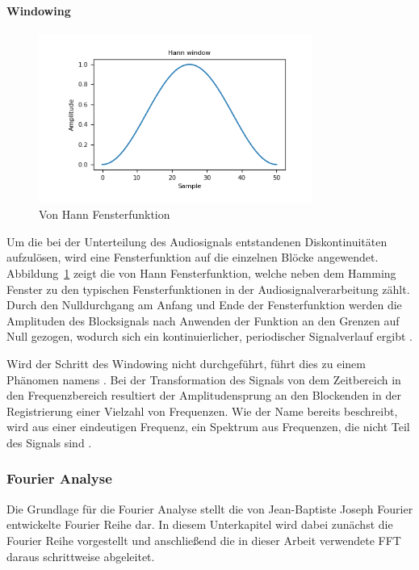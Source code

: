 \paragraph{Windowing}
\begin{figure}
  \centering
  \includegraphics[width=0.8\textwidth, keepaspectratio]{images/hann_window.png}
  \caption{Von Hann Fensterfunktion \autocite[][]{noauthor_numpyhanning_2022}}
  \label{fig:vonHannFenster}
\end{figure}
Um die bei der Unterteilung des Audiosignals entstandenen Diskontinuitäten aufzulösen, wird eine Fensterfunktion auf die einzelnen Blöcke angewendet.
Abbildung~\ref{fig:vonHannFenster} zeigt die von Hann Fensterfunktion, welche neben dem Hamming Fenster zu den typischen Fensterfunktionen in der Audiosignalverarbeitung zählt.
Durch den Nulldurchgang am Anfang und Ende der Fensterfunktion werden die Amplituden des Blocksignals nach Anwenden der Funktion an den Grenzen auf Null gezogen, wodurch sich ein kontinuierlicher, periodischer Signalverlauf ergibt \autocite[vgl.][S. 462]{richter_signal_2022}.

Wird der Schritt des Windowing nicht durchgeführt, führt dies zu einem Phänomen namens .
Bei der Transformation des Signals von dem Zeitbereich in den Frequenzbereich resultiert der Amplitudensprung an den Blockenden in der Registrierung einer Vielzahl von Frequenzen.
Wie der Name bereits beschreibt, wird aus einer eindeutigen Frequenz, ein Spektrum aus Frequenzen, die nicht Teil des Signals sind \autocite[vgl.][S. 1296]{wu_new_2012}.

\subsubsection{Fourier Analyse}

\textauthor{\vJB}{}{}

Die Grundlage für die Fourier Analyse stellt die von Jean-Baptiste Joseph Fourier entwickelte Fourier Reihe dar.
In diesem Unterkapitel wird dabei zunächst die Fourier Reihe vorgestellt und anschließend die in dieser Arbeit verwendete \ac{FFT} daraus schrittweise abgeleitet.

